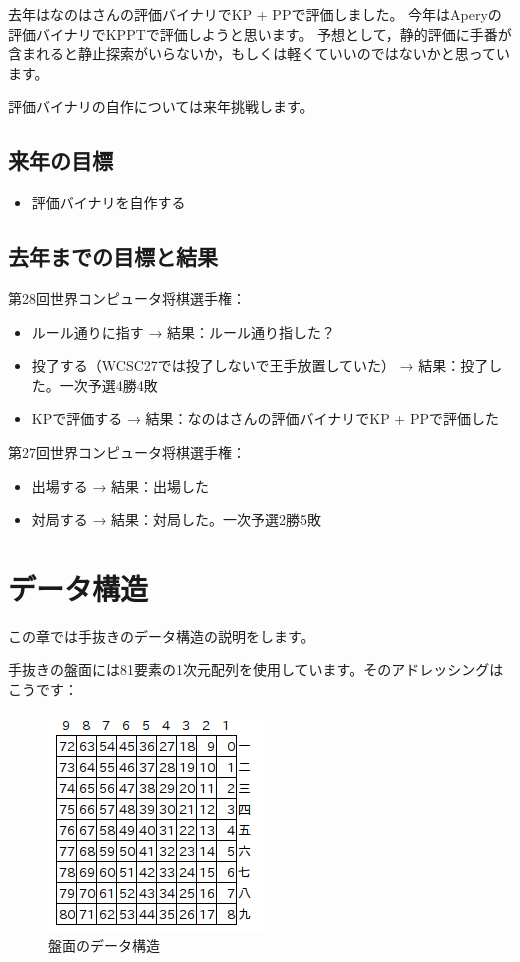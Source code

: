 \documentclass[a4paper]{ltjsarticle}
\begin{document}
去年はなのはさんの評価バイナリでKP + PPで評価しました。
今年はAperyの評価バイナリでKPPTで評価しようと思います。
予想として，静的評価に手番が含まれると静止探索がいらないか，もしくは軽くていいのではないかと思っています。

評価バイナリの自作については来年挑戦します。


\subsection{来年の目標}

\begin{itemize}
\item 評価バイナリを自作する
\end{itemize}


\subsection{去年までの目標と結果}

第28回世界コンピュータ将棋選手権：
\begin{itemize}
\item ルール通りに指す → 結果：ルール通り指した？
\item 投了する（WCSC27では投了しないで王手放置していた） → 結果：投了した。一次予選4勝4敗
\item KPで評価する → 結果：なのはさんの評価バイナリでKP + PPで評価した
\end{itemize}

第27回世界コンピュータ将棋選手権：
\begin{itemize}
\item 出場する → 結果：出場した
\item 対局する → 結果：対局した。一次予選2勝5敗
\end{itemize}



\section{データ構造}

この章では手抜きのデータ構造の説明をします。

手抜きの盤面には81要素の1次元配列を使用しています。そのアドレッシングはこうです：

\begin{figure}[H]
  \centering
  \includegraphics{fig1.png}
  \caption{盤面のデータ構造}
\end{figure}
\end{document}
